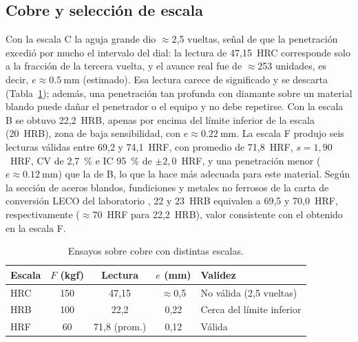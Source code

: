 \documentclass[journal,11pt]{IEEEtran}
\begin{document}
\subsection{Cobre y selección de escala}
Con la escala C la aguja grande dio $\approx$2,5 vueltas, señal de que la penetración excedió por mucho el intervalo del dial: la lectura de 47,15~HRC corresponde solo a la fracción de la tercera vuelta, y el avance real fue de $\approx$253 unidades, es decir, $e\approx\SI{0,5}{\milli\metre}$ (estimado). Esa lectura carece de significado y se descarta (Tabla~\ref{tab:cobre}); además, una penetración tan profunda con diamante sobre un material blando puede dañar el penetrador o el equipo y no debe repetirse. Con la escala B se obtuvo 22,2~HRB, apenas por encima del límite inferior de la escala (20~HRB), zona de baja sensibilidad, con $e\approx\SI{0,22}{\milli\metre}$. La escala F produjo seis lecturas válidas entre 69,2 y 74,1~HRF, con promedio de 71,8~HRF, $s=1{,}90$~HRF, CV de 2,7~\% e IC 95~\% de $\pm2{,}0$~HRF, y una penetración menor ($e\approx\SI{0,12}{\milli\metre}$) que la de B, lo que la hace más adecuada para este material. Según la sección de aceros blandos, fundiciones y metales no ferrosos de la carta de conversión LECO del laboratorio \cite{leco}, 22 y 23~HRB equivalen a 69,5 y 70,0~HRF, respectivamente ($\approx$70~HRF para 22,2~HRB), valor consistente con el obtenido en la escala F.

\begin{table}[!t]
\caption{Ensayos sobre cobre con distintas escalas.}
\label{tab:cobre}
\centering\footnotesize
\begin{tabular}{@{}lccc>{\raggedright\arraybackslash}p{1.9cm}@{}}
\toprule
Escala & $F$ (kgf) & Lectura & $e$ (mm) & Validez\\
\midrule
HRC & 150 & 47,15 & $\approx$0,5 & No válida (2,5 vueltas)\\
HRB & 100 & 22,2 & 0,22 & Cerca del límite inferior\\
HRF & 60 & 71,8 (prom.) & 0,12 & Válida\\
\bottomrule
\end{tabular}
\end{table}
\end{document}
